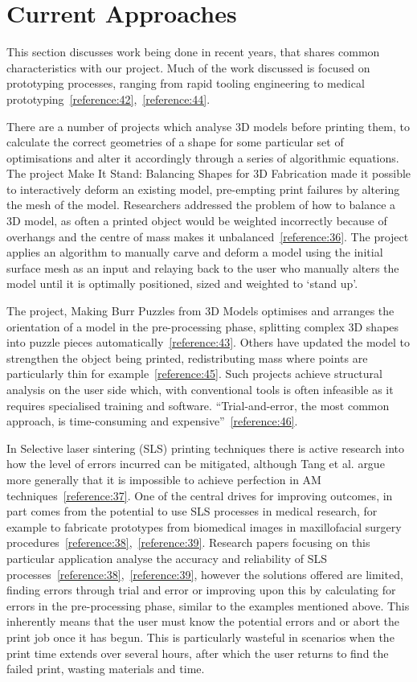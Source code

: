 \documentclass[11pt]{report} %
\begin{document}
\section{Current Approaches}
\label{section:CurrentApproaches}
This section discusses work being done in recent years, that shares common characteristics with our project. Much of the work discussed is focused on prototyping processes, ranging from rapid tooling engineering to medical prototyping~\ref{reference:42},~\ref{reference:44}. 

There are a number of projects which analyse 3D models before printing them, to calculate the correct geometries of a shape for some particular set of optimisations and alter it accordingly through a series of algorithmic equations. The project Make It Stand: Balancing Shapes for 3D Fabrication made it possible to interactively deform an existing model, pre-empting print failures by altering the mesh of the model. Researchers addressed the problem of how to balance a 3D model, as often a printed object would be weighted incorrectly because of overhangs and the centre of mass makes it unbalanced~\ref{reference:36}. The project applies an algorithm to manually carve and deform a model using the initial surface mesh as an input and relaying back to the user who manually alters the model until it is optimally positioned, sized and weighted to `stand up'. 

The project, Making Burr Puzzles from 3D Models optimises and arranges the orientation of a model in the pre-processing phase, splitting complex 3D shapes into puzzle pieces automatically~\ref{reference:43}. Others have updated the model to strengthen the object being printed, redistributing mass where points are particularly thin for example~\ref{reference:45}. Such projects achieve structural analysis on the user side which, with conventional tools is often infeasible as it requires specialised training and software. ``Trial-and-error, the most common approach, is time-consuming and expensive''~\ref{reference:46}. 

In Selective laser sintering (SLS) printing techniques there is active research into how the level of errors incurred can be mitigated, although Tang et al. argue more generally that it is impossible to achieve perfection in AM techniques~\ref{reference:37}. One of the central drives for improving outcomes, in part comes from the potential to use SLS processes in medical research, for example to fabricate prototypes from biomedical images in maxillofacial surgery procedures~\ref{reference:38},~\ref{reference:39}. Research papers focusing on this particular application analyse the accuracy and reliability of SLS processes~\ref{reference:38},~\ref{reference:39}, however the solutions offered are limited, finding errors through trial and error or improving upon this by calculating for errors in the pre-processing phase, similar to the examples mentioned above. This inherently means that the user must know the potential errors and or abort the print job once it has begun. This is particularly wasteful in scenarios when the print time extends over several hours, after which the user returns to find the failed print, wasting materials and time. 
\end{document}
